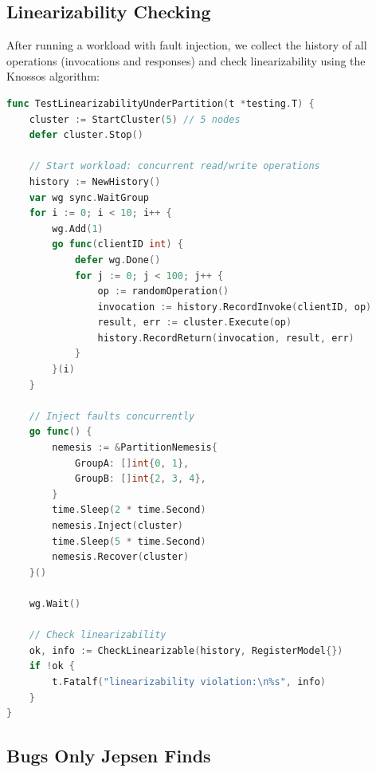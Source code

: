 \subsection{Linearizability Checking}

After running a workload with fault injection, we collect the history of all operations
(invocations and responses) and check linearizability using the Knossos algorithm:

\begin{lstlisting}[language=Go,caption={Linearizability check}]
func TestLinearizabilityUnderPartition(t *testing.T) {
    cluster := StartCluster(5) // 5 nodes
    defer cluster.Stop()

    // Start workload: concurrent read/write operations
    history := NewHistory()
    var wg sync.WaitGroup
    for i := 0; i < 10; i++ {
        wg.Add(1)
        go func(clientID int) {
            defer wg.Done()
            for j := 0; j < 100; j++ {
                op := randomOperation()
                invocation := history.RecordInvoke(clientID, op)
                result, err := cluster.Execute(op)
                history.RecordReturn(invocation, result, err)
            }
        }(i)
    }

    // Inject faults concurrently
    go func() {
        nemesis := &PartitionNemesis{
            GroupA: []int{0, 1},
            GroupB: []int{2, 3, 4},
        }
        time.Sleep(2 * time.Second)
        nemesis.Inject(cluster)
        time.Sleep(5 * time.Second)
        nemesis.Recover(cluster)
    }()

    wg.Wait()

    // Check linearizability
    ok, info := CheckLinearizable(history, RegisterModel{})
    if !ok {
        t.Fatalf("linearizability violation:\n%s", info)
    }
}
\end{lstlisting}

\subsection{Bugs Only Jepsen Finds}

